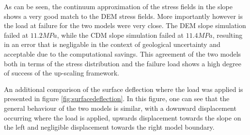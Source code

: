 As can be seen, the continuum approximation of the stress fields in the slope shows a very good match to the DEM stress fields. More importantly however is the load at failure for the two models were very close. The DEM slope simulation failed at $11.2 MPa$, while the CDM slope simulation failed at $11.4 MPa$, resulting in an error that is negligable in the context of geological uncertainty and acceptable due to the computational savings. This agreement of the two models both in terms of the stress distribution and the failure load shows a high degree of success of the up-scaling framework. 

An additional comparison of the surface deflection where the load was applied is presented in figure \ref{fig:surfacedeflection}. In this figure, one can see that the general behaviour of the two models is similar, with a downward displacement occurring where the load is applied, upwards displacement towards the slope on the left and negligible displacement towards the right model boundary. 